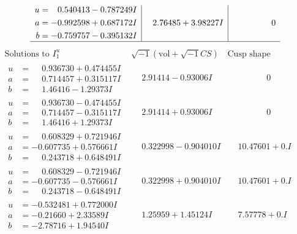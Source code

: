 \documentclass[1p]{elsarticle_modified}
\theoremstyle{definition}
\newcommand{\I}{\sqrt{-1}}
\begin{document}
$$\begin{array}{c|c|c}
\begin{aligned}
u &= \phantom{-}0.540413 - 0.787249 I \\
a &= -0.992598 + 0.687172 I \\
b &= -0.759757 - 0.395132 I\end{aligned}
 & \phantom{-}2.76485 + 3.98227 I & \phantom{-0.000000 } 0\\
 \hline 
 \end{array}$$\newpage$$\begin{array}{c|c|c}  
\text{Solutions to }I^u_{1}& \I (\text{vol} + \sqrt{-1}CS) & \text{Cusp shape}\\
 \hline 
\begin{aligned}
u &= \phantom{-}0.936730 + 0.474455 I \\
a &= \phantom{-}0.714457 + 0.315117 I \\
b &= \phantom{-}1.46416 - 1.29373 I\end{aligned}
 & \phantom{-}2.91414 - 0.93006 I & \phantom{-0.000000 } 0 \\ \hline\begin{aligned}
u &= \phantom{-}0.936730 - 0.474455 I \\
a &= \phantom{-}0.714457 - 0.315117 I \\
b &= \phantom{-}1.46416 + 1.29373 I\end{aligned}
 & \phantom{-}2.91414 + 0.93006 I & \phantom{-0.000000 } 0 \\ \hline\begin{aligned}
u &= \phantom{-}0.608329 + 0.721946 I \\
a &= -0.607735 + 0.576661 I \\
b &= \phantom{-}0.243718 + 0.648491 I\end{aligned}
 & \phantom{-}0.322998 - 0.904010 I & \phantom{-}10.47601 + 0. I\phantom{ +0.000000I} \\ \hline\begin{aligned}
u &= \phantom{-}0.608329 - 0.721946 I \\
a &= -0.607735 - 0.576661 I \\
b &= \phantom{-}0.243718 - 0.648491 I\end{aligned}
 & \phantom{-}0.322998 + 0.904010 I & \phantom{-}10.47601 + 0. I\phantom{ +0.000000I} \\ \hline\begin{aligned}
u &= -0.532481 + 0.772000 I \\
a &= -0.21660 + 2.33589 I \\
b &= -2.78716 + 1.94540 I\end{aligned}
 & \phantom{-}1.25959 + 1.45124 I & \phantom{-}7.57778 + 0. I\phantom{ +0.000000I} \\ \hline\begin{aligned}

\end{aligned}
\end{array}$$
\end{document}

